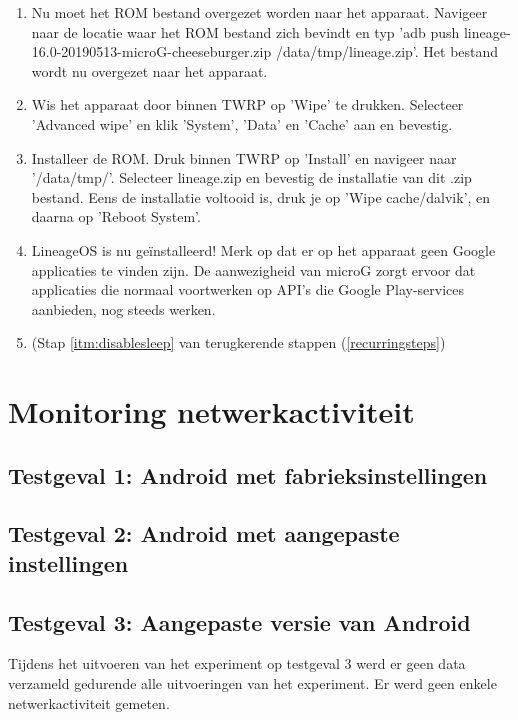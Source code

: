 \begin{enumerate}
    \item Nu moet het ROM bestand overgezet worden naar het apparaat. Navigeer naar de locatie waar het ROM bestand zich bevindt en typ 'adb push lineage-16.0-20190513-microG-cheeseburger.zip /data/tmp/lineage.zip'. Het bestand wordt nu overgezet naar het apparaat.
    
    \item Wis het apparaat door binnen TWRP op 'Wipe' te drukken. Selecteer 'Advanced wipe' en klik 'System', 'Data' en 'Cache' aan en bevestig.
    
    \item Installeer de ROM. Druk binnen TWRP op 'Install' en navigeer naar '/data/tmp/'. Selecteer lineage.zip en bevestig de installatie van dit .zip bestand. Eens de installatie voltooid is, druk je op 'Wipe cache/dalvik', en daarna op 'Reboot System'.
    
    \item 
    LineageOS is nu geïnstalleerd! Merk op dat er op het apparaat geen Google applicaties te vinden zijn. De aanwezigheid van microG zorgt ervoor dat applicaties die normaal voortwerken op API's die Google Play-services aanbieden, nog steeds werken.
    
    \item 
     (Stap \ref{itm:disablesleep} van terugkerende stappen (\ref{recurringsteps})
\end{enumerate}

\section{Monitoring netwerkactiviteit}

\subsection{Testgeval 1: Android met fabrieksinstellingen}

\subsection{Testgeval 2: Android met aangepaste instellingen}

\subsection{Testgeval 3: Aangepaste versie van Android}
Tijdens het uitvoeren van het experiment op testgeval 3 werd er geen data verzameld gedurende alle uitvoeringen van het experiment. Er werd geen enkele netwerkactiviteit gemeten.